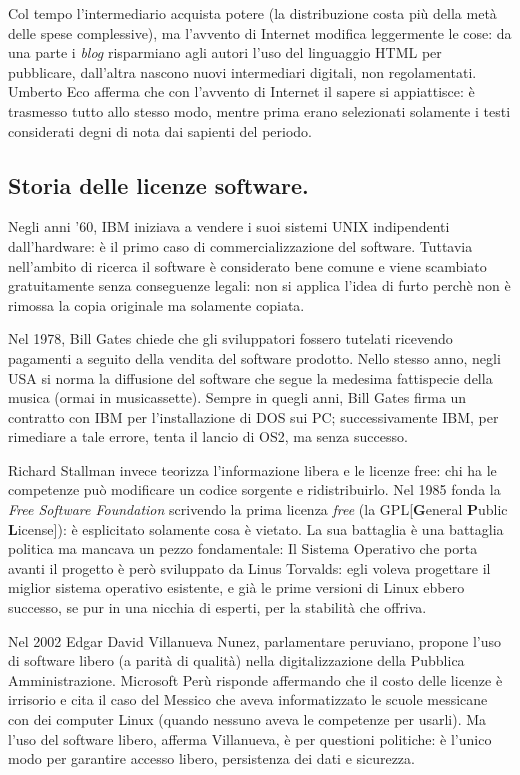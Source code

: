 \documentclass[a4page, 11pt, twocolumn]{article}
\begin{document}
Col tempo l'intermediario acquista potere (la distribuzione costa più della metà delle spese complessive), ma l'avvento di Internet modifica leggermente le cose: da una parte i \textit{blog} risparmiano agli autori l'uso del linguaggio HTML per pubblicare, dall'altra nascono nuovi intermediari digitali, non regolamentati.
Umberto Eco afferma che con l'avvento di Internet il sapere si appiattisce: è trasmesso tutto allo stesso modo, mentre prima erano selezionati solamente i testi considerati degni di nota dai sapienti del periodo.

\subsection{Storia delle licenze software.}
Negli anni '60, IBM iniziava a vendere i suoi sistemi UNIX indipendenti dall'hardware: è il primo caso di commercializzazione del software.
Tuttavia nell'ambito di ricerca il software è considerato bene comune e viene scambiato gratuitamente senza conseguenze legali: non si applica l'idea di furto perchè non è rimossa la copia originale ma solamente copiata.

Nel 1978, Bill Gates chiede che gli sviluppatori fossero tutelati ricevendo pagamenti a seguito della vendita del software prodotto. Nello stesso anno, negli USA si norma la diffusione del software che segue la medesima fattispecie della musica (ormai in musicassette).
Sempre in quegli anni, Bill Gates firma un contratto con IBM per l'installazione di DOS sui PC; successivamente IBM, per rimediare a tale errore, tenta il lancio di OS2, ma senza successo.

Richard Stallman invece teorizza l'informazione libera e le licenze free: chi ha le competenze può modificare un codice sorgente e ridistribuirlo.
Nel 1985 fonda la \textit{Free Software Foundation} scrivendo la prima licenza \textit{free} (la GPL[\textbf{G}eneral \textbf{P}ublic \textbf{L}icense]): è esplicitato solamente cosa è vietato. La sua battaglia è una battaglia politica ma mancava un pezzo fondamentale: Il Sistema Operativo che porta avanti il progetto è però sviluppato da Linus Torvalds: egli voleva progettare il miglior sistema operativo esistente, e già le prime versioni di Linux ebbero successo, se pur in una nicchia di esperti, per la stabilità che offriva. \newline

Nel 2002 Edgar David Villanueva Nunez, parlamentare peruviano, propone l'uso di software libero (a parità di qualità) nella digitalizzazione della Pubblica Amministrazione.
Microsoft Perù risponde affermando che il costo delle licenze è irrisorio e cita il caso del Messico che aveva informatizzato le scuole messicane con dei computer Linux (quando nessuno aveva le competenze per usarli).
Ma l'uso del software libero, afferma Villanueva, è per questioni politiche: è l'unico modo per garantire accesso libero, persistenza dei dati e sicurezza. \newline
\end{document}
